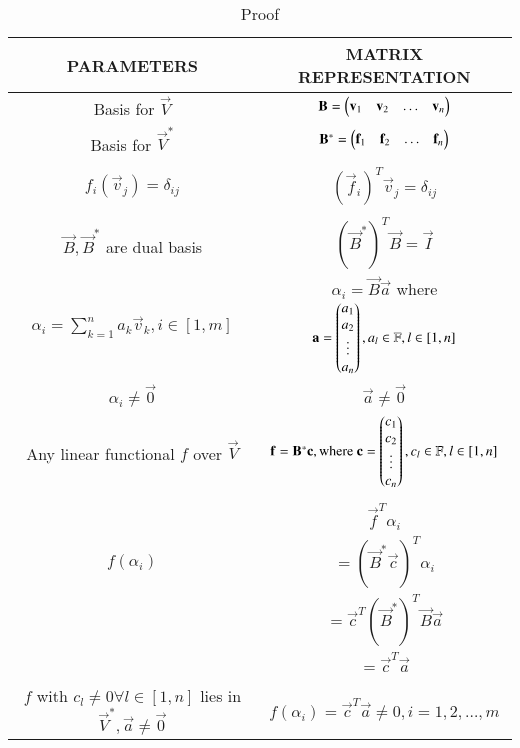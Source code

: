 \begin{table*}[!hb]
\centering
\begin{tabular}{|c|c|}
\hline
\textbf{PARAMETERS}&\textbf{MATRIX REPRESENTATION}\\
\hline
 Basis for $\vec{V}$&$ \mathbf{B}=\begin{pmatrix}\mathbf{v}_1&\mathbf{v}_2&\hdots&\mathbf{v}_n\end{pmatrix}$\\
\hline
Basis for $\vec{V}^*$& $\mathbf{B}^*=\begin{pmatrix}\mathbf{f}_1&\mathbf{f}_2&\hdots&\mathbf{f}_n\end{pmatrix}$\\
\hline
 & \\
$f_i(\vec{v}_j)=\delta_{ij}$& $(\vec{f}_i)^T\vec{v}_j=\delta_{ij}$\\
\hline
 & \\
$\vec{B},\vec{B}^*$ are dual basis&$(\vec{B}^*)^T\vec{B}=\vec{I}$\\
\hline
$\alpha_i=\sum _{k=1}^n a_k\vec{v}_k,i\in [1,m]$&$ \alpha_i=\vec{B}\vec{a}$ where $ \mathbf{a}=\begin{pmatrix}a_1\\a_2\\\vdots\\a_n\end{pmatrix}, a_l \in \mathbb{F},l \in [1,n]$\\
\hline
$\alpha_i\neq \vec{0}$&$\vec{a}\neq\vec{0}$\\
\hline
Any linear functional $f$ over $\vec{V}$& $\mathbf{f}=\mathbf{B}^*\mathbf{c},\text{where }\mathbf{c}=\begin{pmatrix}c_1\\c_2\\\vdots\\c_n\end{pmatrix}, c_l \in \mathbb{F} ,l \in [1,n]$\\
\hline
 & \\
 & $ \vec{f}^T\alpha_i$\\
$ f(\alpha_i)$ &$
    =(\vec{B}^*\vec{c})^T\alpha_i$\\
     &$=\vec{c}^T(\vec{B}^*)^T\vec{B}\vec{a}$\\
     &$=\vec{c}^T\vec{a}$ \\
\hline
 & \\
$f$ with  $c_l \neq 0 \forall l \in [1,n]$ lies in $\vec{V}^*,\vec{a}\neq\vec{0}$ & $f(\alpha_i)=\vec{c}^T\vec{a}\neq 0, i=1,2,\hdots,m $\\
\hline
\end{tabular}
\caption{Proof}
\label{eq:table/solutions/3/5/14/1}
\end{table*}


